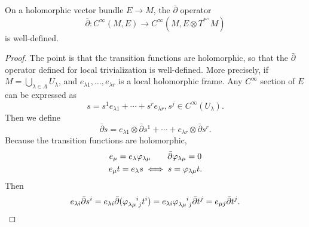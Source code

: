 \documentclass[12pt]{article}
\begin{document}
\begin{lemma}
  On a holomorphic vector bundle \(E\to M\), the \(\bar{\partial}\) operator \[
    \bar{\partial}\colon C^\infty(M,E)\longrightarrow C^\infty(M,E\otimes T^{*\prime
    \prime}M)
  \] is well-defined.
\end{lemma}
\begin{proof}
  The point is that the transition functions are holomorphic, so that the
  \(\bar{\partial}\) operator defined for local trivialization is well-defined.
  More precisely, if \(M=\bigcup_{\lambda\in \Lambda}U_\lambda\), and 
  \(e_{\lambda 1},\ldots,e_{\lambda r}\) is a local holomorphic frame. Any \(C^\infty\)
  section of \(E\) can be expressed as \[
    s=s^1 e_{\lambda 1}+\cdots +s^r e_{\lambda r}, s^j \in C^\infty(U_\lambda)
  .\] Then we define \[
    \bar{\partial}s=e_{\lambda 1}\otimes \bar{\partial}s^1+\cdots 
    +e_{\lambda r}\otimes \bar{\partial}s^r
  .\] Because the transition functions are holomorphic, \ie\ 
  \begin{gather*}
    e_\mu=e_\lambda\varphi_{\lambda\mu}\qquad \bar{\partial}\varphi_{\lambda\mu}=0 \\
    e_\mu t=e_\lambda s\iff s=\varphi_{\lambda\mu}t
  .\end{gather*} 
  Then \[
    e_{\lambda i}\bar{\partial}s^i=e_{\lambda i}\bar{\partial}(\vphi\indices{_\lambda
    _\mu^i_j}t^i)=e_{\lambda i}\vphi\indices{_\lambda_\mu^i_j}\bar{\partial}t^j
    =e_{\mu j}\bar{\partial}t^j
  .\] 
\end{proof}
\end{document}
